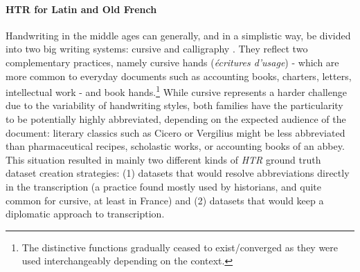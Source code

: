 \documentclass{article}
\newcommand{\juni}[1]{\textsf{\junicodeFont #1}}%
\begin{document}
\paragraph{HTR for Latin and Old French}


Handwriting in the middle ages can generally, and in a simplistic way, be divided into two big writing systems: cursive and calligraphy \cite[pp.~58 sqq.]{bischoff1985paleographie}. They reflect two complementary practices, namely cursive hands (\textit{écritures d'usage}) - which are more common to everyday documents such as accounting books, charters, letters, intellectual work - and book hands.\footnote{The distinctive functions gradually ceased to exist/converged as they were used interchangeably depending on the context.} While cursive represents a harder challenge due to the variability of handwriting styles, both families have the particularity to be potentially highly abbreviated, depending on the expected audience of the document: literary classics such as Cicero or Vergilius might be less abbreviated than pharmaceutical recipes, scholastic works, or accounting books of an abbey. This situation resulted in mainly two different kinds of \textit{HTR} ground truth dataset creation strategies: (1) datasets that would resolve abbreviations directly in the transcription (a practice found mostly used by historians, and quite common for cursive, at least in France) and (2) datasets that would keep a diplomatic approach to transcription.

 
\end{document}
